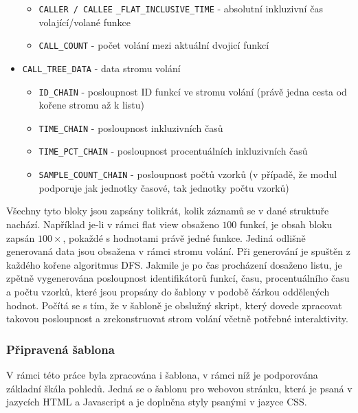 \documentclass[czech,BP]{thesiskiv}
\begin{document}
\begin{itemize}
\begin{itemize}
	\item \texttt{CALLER / CALLEE} \texttt{\_FLAT\_INCLUSIVE\_TIME} - absolutní inkluzivní čas volající/volané funkce
	\item \texttt{CALL\_COUNT} - počet volání mezi aktuální dvojicí funkcí
	\end{itemize}
\item \texttt{CALL\_TREE\_DATA} - data stromu volání
	\begin{itemize}
	\item \texttt{ID\_CHAIN} - posloupnost ID funkcí ve stromu volání (právě jedna cesta od kořene stromu až k listu)
	\item \texttt{TIME\_CHAIN} - posloupnost inkluzivních časů
	\item \texttt{TIME\_PCT\_CHAIN} - posloupnost procentuálních inkluzivních časů
	\item \texttt{SAMPLE\_COUNT\_CHAIN} - posloupnost počtů vzorků (v případě, že modul podporuje jak jednotky časové, tak jednotky počtu vzorků)
	\end{itemize}
\end{itemize}

Všechny tyto bloky jsou zapsány tolikrát, kolik záznamů se v dané struktuře nachází. Například je-li v rámci flat view obsaženo $100$ funkcí, je obsah bloku zapsán $100\times$, pokaždé s hodnotami právě jedné funkce. Jediná odlišně generovaná data jsou obsažena v rámci stromu volání. Při generování je spuštěn z každého kořene algoritmus DFS. Jakmile je po čas procházení dosaženo listu, je zpětně vygenerována posloupnost identifikátorů funkcí, času, procentuálního času a počtu vzorků, které jsou propsány do šablony v podobě čárkou oddělených hodnot. Počítá se s tím, že v šabloně je obslužný skript, který dovede zpracovat takovou posloupnost a zrekonstruovat strom volání včetně potřebné interaktivity.

\subsubsection*{Připravená šablona}

V rámci této práce byla zpracována i šablona, v rámci níž je podporována základní škála pohledů. Jedná se o šablonu pro webovou stránku, která je psaná v jazycích HTML a Javascript a je doplněna styly psanými v jazyce CSS.
\end{document}
